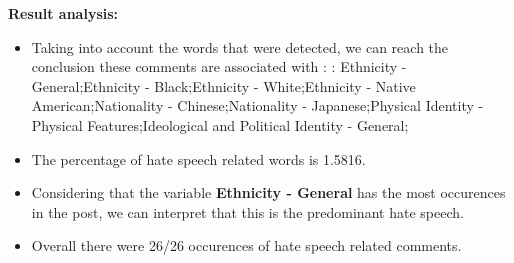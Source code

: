 \documentclass[11pt]{article}
\begin{document}
\textbf{\Large Result analysis:}

\begin{itemize}\item Taking into account the words that were detected, we can reach the conclusion these comments are associated with : : Ethnicity - General;Ethnicity - Black;Ethnicity - White;Ethnicity - Native American;Nationality - Chinese;Nationality - Japanese;Physical Identity - Physical Features;Ideological and Political Identity - General;%

\item The percentage of hate speech related words is 1.5816.

\item Considering that the variable \textbf{Ethnicity - General} has the most occurences in the post, we can interpret that this is the predominant hate speech.

\item Overall there were 26/26 occurences of hate speech related comments.\end{itemize}
\end{document}
